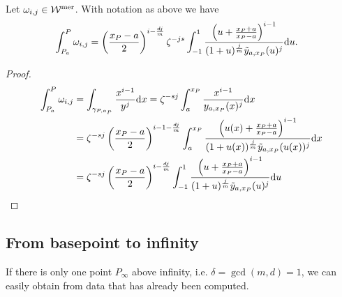 \documentclass[main.tex]{subfiles}
\begin{document}
  \begin{thm}\label{thm:ajm_finite_int}
  Let $\omega_{i,j} \in \mathcal{W}^{\text{mer}}$. With notation as above we have
 \begin{align}\label{eq:aj_int}
  \begin{split}
       \int_{P_a}^P \omega_{i,j} & = \left(\frac{x_P-a}{2}\right)^{i-\frac{dj}{m}} \zeta^{-js} \int_{-1}^1
      \frac{\left(u + \frac{x_P+a}{x_P-a}\right)^{i-1}}{(1+u)^{\frac{j}{m}} \tilde{y}_{a,x_P}(u)^j}  \mathrm d u.
   \end{split}
   \end{align}
  \end{thm}
  \begin{proof}
    \begin{align}
    \begin{split}
     \int_{P_a}^P \omega_{i,j}  & =  \int_{\gamma_{P,a_P}} \frac{x^{i-1}}{y^j}  \mathrm d x  =  \zeta^{-sj} \int_a^{x_P} \frac{x^{i-1}}{y_{a,x_P}(x)^j}  \mathrm d x \\  & = 
     \zeta^{-sj} \left(\frac{x_P-a}{2}\right)^{i-1-\frac{dj}{m}}
     \int_a^{x_P} \frac{\left(u(x)+\frac{x_P+a}{x_P-a}\right)^{i-1}}{(1+u(x))^{\frac{j}{m}}\tilde{y}_{a,x_P}(u(x))^j}  \mathrm d x \\
     & =  \zeta^{-sj} \left(\frac{x_P-a}{2}\right)^{i-\frac{dj}{m}}
     \int_{-1}^{1} \frac{\left(u+\frac{x_P+a}{x_P-a}\right)^{i-1}}{(1+u)^{\frac{j}{m}}\tilde{y}_{a,x_P}(u)^j}  \mathrm d u \\
    \end{split}
  \end{align}
  \end{proof}

  \subsection{From basepoint to infinity}\label{subsec:ajm_infty}

    If there is only one point $P_{\infty}$ above infinity, i.e. $\delta = \gcd(m,d) = 1$, we can easily obtain from data that has already been computed.
\end{document}
